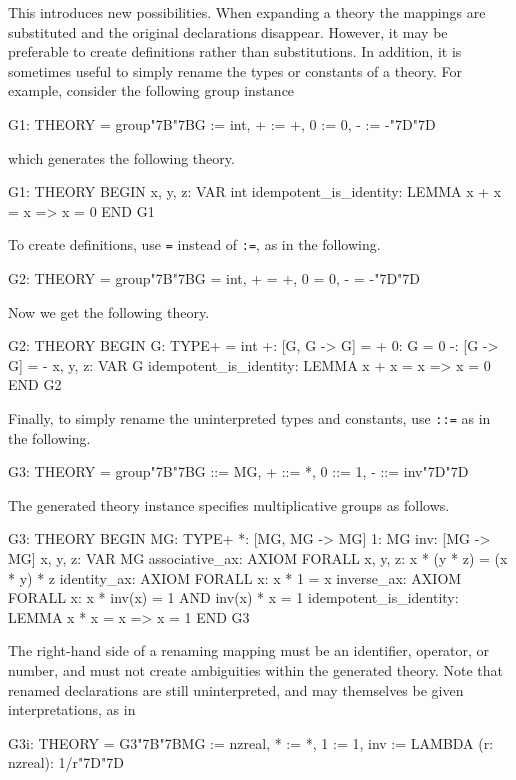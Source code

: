 \documentclass[11pt,twoside,openright,titlepage]{cslreport}
\def\mapb{\char"7B\char"7B}
\def\mape{\char"7D\char"7D}
\begin{document}
This introduces new possibilities.  When expanding a theory the
mappings are substituted and the original declarations disappear.
However, it may be preferable to create definitions rather than
substitutions.  In addition, it is sometimes useful to simply rename the
types or constants of a theory.  For example, consider the following group
instance
\begin{session}
G1: THEORY = group\mapb{}G := int, + := +, 0 := 0, - := -\mape{}
\end{session}
\noindent which generates the following theory.
\label{group-instances-start}
\begin{session}
G1: THEORY
 BEGIN
  x, y, z: VAR int
  idempotent_is_identity: LEMMA x + x = x => x = 0
 END G1
\end{session}
To create definitions, use \texttt{=} instead of \texttt{:=}, as
in the following.
\begin{session}
G2: THEORY = group\mapb{}G = int, + = +, 0 = 0, - = -\mape{}
\end{session}
\noindent Now we get the following theory.
\begin{session}
G2: THEORY
 BEGIN
  G: TYPE+ = int
  +: [G, G -> G] = +
  0: G = 0
  -: [G -> G] = -
  x, y, z: VAR G
  idempotent_is_identity: LEMMA x + x = x => x = 0
 END G2
\end{session}
Finally, to simply rename the uninterpreted types and constants, use
\texttt{::=} as in the following.
\begin{session}
G3: THEORY = group\mapb{}G ::= MG, + ::= *, 0 ::= 1, - ::= inv\mape{}
\end{session}
\noindent The generated theory instance specifies multiplicative groups as
follows.
\begin{session}
G3: THEORY
 BEGIN
  MG: TYPE+
  *: [MG, MG -> MG]
  1: MG
  inv: [MG -> MG]
  x, y, z: VAR MG
  associative_ax: AXIOM FORALL x, y, z: x * (y * z) = (x * y) * z
  identity_ax: AXIOM FORALL x: x * 1 = x
  inverse_ax: AXIOM FORALL x: x * inv(x) = 1 AND inv(x) * x = 1
  idempotent_is_identity: LEMMA x * x = x => x = 1
 END G3
\end{session}
The right-hand side of a renaming mapping must be an identifier, operator,
or number, and must not create ambiguities within the generated theory.
Note that renamed declarations are still uninterpreted, and may themselves
be given interpretations, as in
\begin{session}
G3i: THEORY = G3\mapb{}MG := nzreal, * := *, 1 := 1,
                  inv := LAMBDA (r: nzreal): 1/r\mape{}
\end{session}
\end{document}
